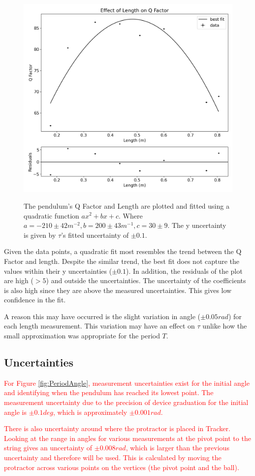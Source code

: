 \documentclass[12pt,twocolumn]{article}
\begin{document}
\begin{figure}[!h]
\begin{centering}
\includegraphics[width=0.5 \textwidth]{images/Effect of Length on Q Factor.png}
\label{fig:QLength}
\caption{The pendulum's Q Factor and
Length are plotted and fitted using a
quadratic function $ax^2 + bx + c$. Where
$a = -210 \pm 42 m^{-2}, b = 200 \pm 43 m^{-1}, c = 30 \pm 9$.
The y uncertainty is given by $\tau$'s fitted uncertainty of $\pm 0.1$.}
\end{centering}
\end{figure}

Given the data points, a quadratic fit most resembles the trend between the Q Factor and length. Despite the similar trend,
the best fit does not capture the values within their y uncertainties ($\pm 0.1$). In addition, the residuals of the plot are high ($> 5$) and outside the uncertainties.
The uncertainty of the coefficients is also high since they are above the measured uncertainties.
This gives low confidence in the fit.

A reason this may have occurred is the slight variation in angle ($\pm 0.05 rad$) for each length measurement. 
This variation may have an effect on $\tau$ unlike how the small approximation was appropriate for the period $T$.


\subsection{Uncertainties}

\textcolor{red}{For Figure \ref{fig:PeriodAngle}, measurement uncertainties exist
for the initial angle and identifying when the
pendulum has reached its lowest point. The
measurement uncertainty due to the precision
of device graduation for the initial angle is
$\pm0.1deg$, which is approximately $\pm0.001rad$.}

\textcolor{red}{There is also uncertainty around where the
protractor is placed in Tracker. Looking at the range in angles for various measurements
at the pivot point to the string gives an uncertainty of $\pm0.008rad$, which is larger than
the previous uncertainty and therefore will be
used. This is calculated by moving the protractor across various points on the vertices
(the pivot point and the ball).}
\end{document}
